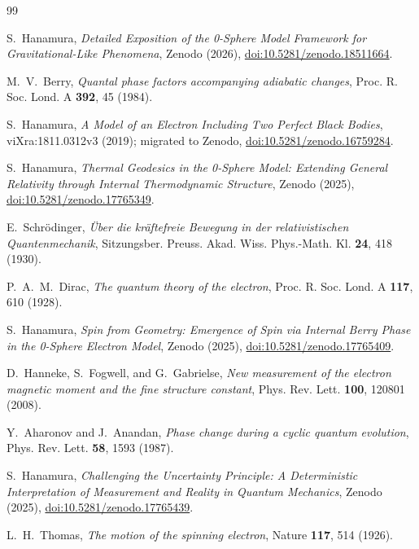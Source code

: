 \documentclass[%
 reprint,
 amsmath,amssymb,
 aps,
 prb,
]{revtex4-2}
\numberwithin{equation}{section}
\theoremstyle{definition}
\theoremstyle{remark}
\begin{document}
\begin{thebibliography}{99}

S.~Hanamura,
\emph{Detailed Exposition of the 0-Sphere Model Framework for Gravitational-Like Phenomena},
Zenodo (2026), \href{https://doi.org/10.5281/zenodo.18511664}{doi:10.5281/zenodo.18511664}.

M.~V.~Berry,
\emph{Quantal phase factors accompanying adiabatic changes},
Proc. R. Soc. Lond. A \textbf{392}, 45 (1984).

S.~Hanamura,
\emph{A Model of an Electron Including Two Perfect Black Bodies},
viXra:1811.0312v3 (2019); migrated to Zenodo, \href{https://doi.org/10.5281/zenodo.16759284}{doi:10.5281/zenodo.16759284}.

S.~Hanamura,
\emph{Thermal Geodesics in the 0-Sphere Model: Extending General Relativity through Internal Thermodynamic Structure},
Zenodo (2025), \href{https://doi.org/10.5281/zenodo.17765349}{doi:10.5281/zenodo.17765349}.

E.~Schr\"odinger,
\emph{\"Uber die kr\"aftefreie Bewegung in der relativistischen Quantenmechanik},
Sitzungsber. Preuss. Akad. Wiss. Phys.-Math. Kl. \textbf{24}, 418 (1930).

P.~A.~M.~Dirac,
\emph{The quantum theory of the electron},
Proc. R. Soc. Lond. A \textbf{117}, 610 (1928).

S.~Hanamura,
\emph{Spin from Geometry: Emergence of Spin via Internal Berry Phase in the 0-Sphere Electron Model},
Zenodo (2025), \href{https://doi.org/10.5281/zenodo.17765409}{doi:10.5281/zenodo.17765409}.

D.~Hanneke, S.~Fogwell, and G.~Gabrielse,
\emph{New measurement of the electron magnetic moment and the fine structure constant},
Phys. Rev. Lett. \textbf{100}, 120801 (2008).

Y.~Aharonov and J.~Anandan,
\emph{Phase change during a cyclic quantum evolution},
Phys. Rev. Lett. \textbf{58}, 1593 (1987).

S.~Hanamura,
\emph{Challenging the Uncertainty Principle: A Deterministic Interpretation of Measurement and Reality in Quantum Mechanics},
Zenodo (2025), \href{https://doi.org/10.5281/zenodo.17765439}{doi:10.5281/zenodo.17765439}.

L.~H.~Thomas,
\emph{The motion of the spinning electron},
Nature \textbf{117}, 514 (1926).


\end{thebibliography}
\end{document}
